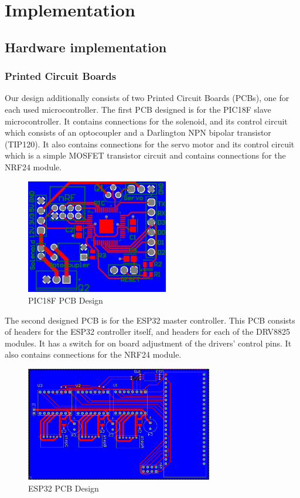 \chapter{Implementation}

\section{Hardware implementation}

\subsection{Printed Circuit Boards}

Our design additionally consists of two Printed Circuit Boards (PCBs), one for each used microcontroller. The first PCB designed is for the PIC18F slave microcontroller. It contains connections for the solenoid, and its control circuit which consists of an optocoupler and a Darlington NPN bipolar transistor (TIP120). It also contains connections for the servo motor and its control circuit which is a simple MOSFET transistor circuit and contains connections for the NRF24 module.

\begin{figure}[h]
	\centering\includegraphics[height=5cm]{./images/picpcb}
	\caption{PIC18F PCB Design}
\end{figure}

The second designed PCB is for the ESP32 master controller. This PCB consists of headers for the ESP32 controller itself, and headers for each of the DRV8825 modules. It has a switch for on board adjustment of the drivers' control pins. It also contains connections for the NRF24 module.

\begin{figure}[h]
	\centering\includegraphics[height=5cm]{./images/esppcb}
	\caption{ESP32 PCB Design}
\end{figure}


